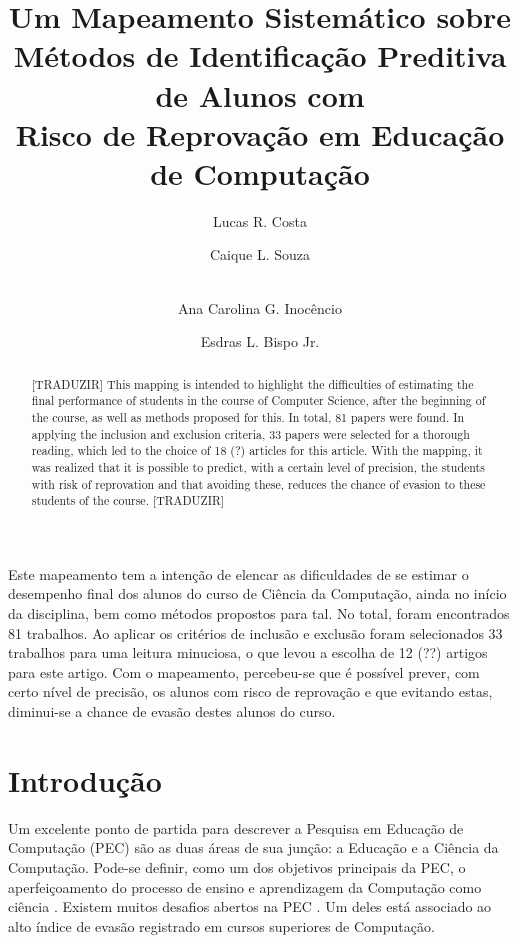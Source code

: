 \documentclass[12pt]{article}
\title{Um Mapeamento Sistemático sobre \\Métodos de Identificação Preditiva de Alunos com \\Risco de Reprovação em Educação de Computação}
\author{Lucas R. Costa \and Caique L. Souza \and
\\Ana Carolina G. Inocêncio \and Esdras L. Bispo Jr.}
\begin{document}
 
\maketitle

\begin{abstract}
  [TRADUZIR]
  This mapping is intended to highlight the difficulties of estimating the final performance of students in the course of Computer Science, after the beginning of the course, as well as methods proposed for this. In total, 81 papers were found. In applying the inclusion and exclusion criteria, 33 papers were selected for a thorough reading, which led to the choice of 18 (?) articles for this article. With the mapping, it was realized that it is possible to predict, with a certain level of precision, the students with risk of reprovation and that avoiding these, reduces the chance of evasion to these students of the course.
  [TRADUZIR]
\end{abstract}
     
\begin{resumo} 
Este mapeamento tem a intenção de elencar as dificuldades de se estimar o desempenho final dos alunos do curso de Ciência da Computação, ainda no início da disciplina, bem como métodos propostos para tal. No total, foram encontrados 81 trabalhos. Ao aplicar os critérios de inclusão e exclusão foram selecionados 33 trabalhos para uma leitura minuciosa, o que levou a escolha de 12 (??) artigos para este artigo. Com o mapeamento, percebeu-se que é possível prever, com certo nível de precisão, os alunos com risco de reprovação e que evitando estas, diminui-se a chance de evasão destes alunos do curso.
\end{resumo}


\section{Introdução}

Um excelente ponto de partida para descrever a Pesquisa em Educação de Computação (PEC) são as duas áreas de sua junção: a Educação e a Ciência da Computação. Pode-se definir, como um dos objetivos principais da PEC, o aperfeiçoamento do processo de ensino e aprendizagem da Computação como ciência \cite{holmboe:2001}. Existem muitos desafios abertos na PEC \cite{robins:2015}. Um deles está associado ao alto índice de evasão registrado em cursos superiores de Computação.
\end{document}
